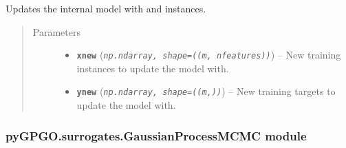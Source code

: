 \documentclass[letterpaper,10pt,english]{sphinxmanual}
\begin{document}
\begin{fulllineitems}
\begin{fulllineitems}
\label{pyGPGO.surrogates.GaussianProcess:pyGPGO.surrogates.GaussianProcess.GaussianProcess.update}
Updates the internal model with  and  instances.
\begin{quote}\begin{description}
\item[{Parameters}] \leavevmode\begin{itemize}
\item {} 
\textbf{\texttt{xnew}} (\emph{\texttt{np.ndarray, shape=((m, nfeatures))}}) -- New training instances to update the model with.

\item {} 
\textbf{\texttt{ynew}} (\emph{\texttt{np.ndarray, shape=((m,))}}) -- New training targets to update the model with.

\end{itemize}

\end{description}\end{quote}

\end{fulllineitems}


\end{fulllineitems}



\subsubsection{pyGPGO.surrogates.GaussianProcessMCMC module}
\label{pyGPGO.surrogates.GaussianProcessMCMC:pygpgo-surrogates-gaussianprocessmcmc-module}\label{pyGPGO.surrogates.GaussianProcessMCMC:module-pyGPGO.surrogates.GaussianProcessMCMC}\label{pyGPGO.surrogates.GaussianProcessMCMC::doc}
\end{document}
